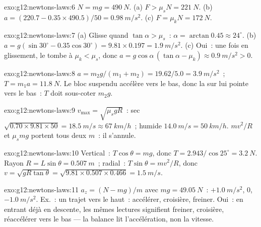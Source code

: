 \begin{solution}{exo:g12:newtons-laws:6}
$N = mg = \qty{490}{N}$. (a) $F > \mu_s N = \qty{221}{N}$.
(b) $a = (220.7 - 0.35 \times 490.5)/50 = \qty{0.98}{m/s^2}$.
(c) $F = \mu_k N = \qty{172}{N}$.
\end{solution}

\begin{solution}{exo:g12:newtons-laws:7}
(a) Glisse quand $\tan\alpha > \mu_s$~: $\alpha = \arctan 0.45 \approx
24^\circ$. (b) $a = g(\sin 30^\circ - 0.35\cos 30^\circ) =
9.81 \times 0.197 = \qty{1.9}{m/s^2}$. (c) Oui~: une fois en glissement,
le  tombe à $\mu_k < \mu_s$, donc
$a = g\cos\alpha\,(\tan\alpha - \mu_k) \approx \qty{0.9}{m/s^2} > 0$.
\end{solution}

\begin{solution}{exo:g12:newtons-laws:8}
$a = m_2 g/(m_1 + m_2) = 19.62/5.0 = \qty{3.9}{m/s^2}$~;
$T = m_1 a = \qty{11.8}{N}$. Le bloc suspendu accélère vers le bas,
donc la  sur lui pointe vers le bas~: $T$ doit
sous-coter $m_2 g$.
\end{solution}

\begin{solution}{exo:g12:newtons-laws:9}
$v_{\max} = \sqrt{\mu_s g R}$~: sec
$\sqrt{0.70 \times 9.81 \times 50} = \qty{18.5}{m/s} \approx
\qty{67}{km/h}$~; humide $\qty{14.0}{m/s} = \qty{50}{km/h}$. $mv^2/R$
et $\mu_s mg$ portent tous deux $m$~: il s'annule.
\end{solution}

\begin{solution}{exo:g12:newtons-laws:10}
Vertical~: $T\cos\theta = mg$, donc
$T = 2.943/\cos 25^\circ = \qty{3.2}{N}$. Rayon $R = L\sin\theta =
\qty{0.507}{m}$~; radial~: $T\sin\theta = mv^2/R$, donc
$v = \sqrt{gR\tan\theta} = \sqrt{9.81 \times 0.507 \times 0.466}
= \qty{1.5}{m/s}$.
\end{solution}

\begin{solution}{exo:g12:newtons-laws:11}
$a_z = (N - mg)/m$ avec $mg = \qty{49.05}{N}$~: $+\qty{1.0}{m/s^2}$,
$0$, $-\qty{1.0}{m/s^2}$. Ex.~: un trajet vers le haut~: accélérer,
croisière, freiner. Oui~: en entrant déjà en descente, les mêmes
lectures signifient freiner, croisière, réaccélérer vers le bas ---
la balance lit l'accélération, non la vitesse.
\end{solution}

